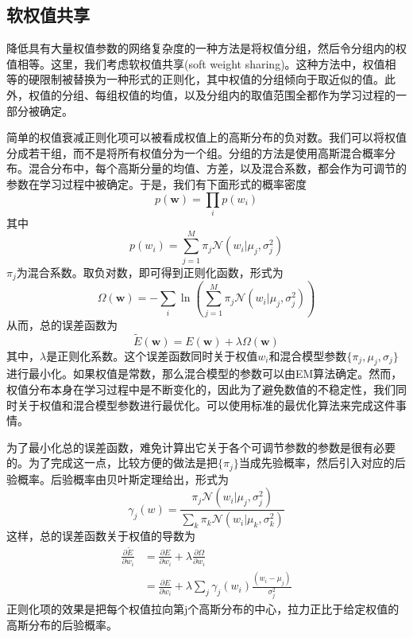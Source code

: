 \subsection*{软权值共享}
降低具有大量权值参数的网络复杂度的一种方法是将权值分组，然后令分组内的权值相等。这里，我们考虑软权值共享(soft weight sharing)。这种方法中，权值相等的硬限制被替换为一种形式的正则化，其中权值的分组倾向于取近似的值。此外，权值的分组、每组权值的均值，以及分组内的取值范围全都作为学习过程的一部分被确定。

简单的权值衰减正则化项可以被看成权值上的高斯分布的负对数。我们可以将权值分成若干组，而不是将所有权值分为一个组。分组的方法是使用高斯混合概率分布。混合分布中，每个高斯分量的均值、方差，以及混合系数，都会作为可调节的参数在学习过程中被确定。于是，我们有下面形式的概率密度
\begin{equation}
	p(\boldsymbol{w})=\prod_ip(w_i)
\end{equation}
其中
\begin{equation}
	p(w_i)=\sum_{j=1}^{M}\pi_j\mathcal{N}(w_i|\mu_j,\sigma_j^2)
\end{equation}
$\pi_j$为混合系数。取负对数，即可得到正则化函数，形式为
\begin{equation}
	\Omega(\boldsymbol{w})=-\sum_i\ln\left(\sum_{j=1}^{M}\pi_j\mathcal{N}(w_i|\mu_j,\sigma_j^2) \right)
\end{equation}
从而，总的误差函数为
\begin{equation}
	\tilde{E}(\boldsymbol{w})=E(\boldsymbol{w})+\lambda \Omega(\boldsymbol{w})
\end{equation}
其中，$\lambda$是正则化系数。这个误差函数同时关于权值$w_i$和混合模型参数$\{\pi_j,\mu_j,\sigma_j \}$进行最小化。如果权值是常数，那么混合模型的参数可以由EM算法确定。然而，权值分布本身在学习过程中是不断变化的，因此为了避免数值的不稳定性，我们同时关于权值和混合模型参数进行最优化。可以使用标准的最优化算法来完成这件事情。

为了最小化总的误差函数，难免计算出它关于各个可调节参数的参数是很有必要的。为了完成这一点，比较方便的做法是把$\{\pi_j \}$当成先验概率，然后引入对应的后验概率。后验概率由贝叶斯定理给出，形式为
\begin{equation}
	\gamma_j(w)=\frac{\pi_j\mathcal{N}(w_i|\mu_j,\sigma_j^2)}{\sum_k\pi_k\mathcal{N}(w_i|\mu_k,\sigma_k^2)}
\end{equation}
这样，总的误差函数关于权值的导数为
\begin{equation}
	\begin{aligned}
	\frac{\partial \tilde{E}}{\partial w_i}&=\frac{\partial E}{\partial w_i}+\lambda\frac{\partial \Omega}{\partial w_i}\\
	&=\frac{\partial E}{\partial w_i}+\lambda\sum_{j}\gamma_j(w_i)\frac{(w_i-\mu_j)}{\sigma_j^2}
	\end{aligned}
\end{equation}
正则化项的效果是把每个权值拉向第j个高斯分布的中心，拉力正比于给定权值的高斯分布的后验概率。

